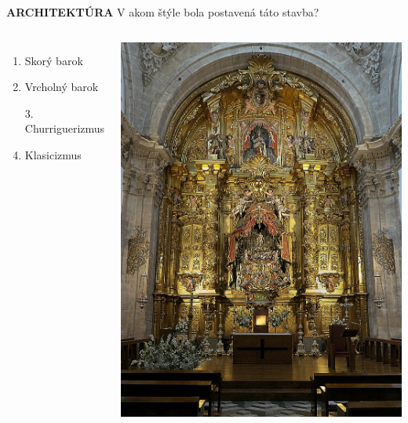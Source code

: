 \documentclass[dvipsnames]{beamer}
\begin{document}
\begin{frame}
	\textbf{ARCHITEKTÚRA}
	\vskip 3mm
	V akom štýle bola postavená táto stavba?
	\begin{columns}
		\begin{enumerate}
			\item Skorý barok
			\item Vrcholný barok
			\item [\textcolor{g}{3.}] \textcolor{g}{Churriguerizmus}\setcounter{enumi}{3}
			\item Klasicizmus
		\end{enumerate}
		\includegraphics[scale=0.2]{ultra}

	\end{columns}
\end{frame}
\end{document}
